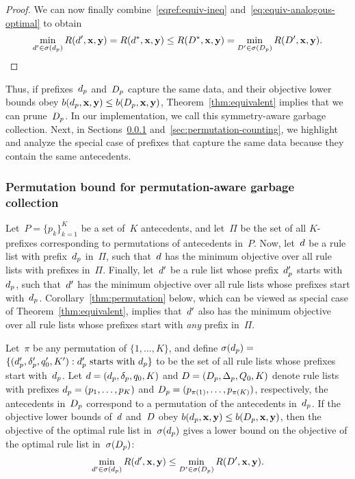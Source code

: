\begin{proof}
We can now finally combine~\eqref{eqref:equiv-ineq}
and~\eqref{eq:equiv-analogous-optimal} to obtain
\begin{align}
\min_{\RL' \in \StartsWith(\Prefix)} \Obj(\RL', \x, \y)
= \Obj(\RL^*, \x, \y) \le \Obj(\RLB^*, \x, \y)
= \min_{\RLB' \in \StartsWith(\PrefixB)} \Obj(\RLB', \x, \y).
\end{align}
\end{proof}

Thus, if prefixes~$d_p$ and~$D_p$ capture the same data,
and their objective lower bounds obey
${b(d_p, \mathbf{x}, \mathbf{y}) \le b(D_p, \mathbf{x}, \mathbf{y})}$,
Theorem~\ref{thm:equivalent} implies that we can prune~$D_p$.
%
In our implementation, we call this symmetry-aware garbage collection.
%
Next, in Sections~\ref{sec:permutation} and~\ref{sec:permutation-counting},
we highlight and analyze the special case of prefixes that capture
the same data because they contain the same antecedents.

\subsubsection{Permutation bound for permutation-aware garbage collection}
\label{sec:permutation}

Let~${P = \{p_k\}_{k=1}^K}$ be a set of~$K$ antecedents,
and let~$\Pi$ be the set of all $K$-prefixes corresponding to
permutations of antecedents in~$P$.
%
Now, let~${d}$ be a rule list with prefix~$d_p$ in~$\Pi$,
such that~${d}$ has the minimum objective over all rule lists
with prefixes in~$\Pi$.
%
Finally, let~${d}'$ be a rule list whose prefix~$d_p'$
starts with~$d_p$, such that~${d}'$ has the minimum objective
over all rule lists whose prefixes start with~$d_p$.
%
Corollary~\ref{thm:permutation} below,
which can be viewed as special case of Theorem~\ref{thm:equivalent},
implies that~${d}'$ also has the minimum objective over all
rule lists whose prefixes start with \emph{any} prefix in~$\Pi$.

\begin{corollary}
\label{thm:permutation}
Let~$\pi$ be any permutation of ${\{1, \dots, K\}}$,
and define ${\sigma(d_p) = }$
${\{(d_p', \delta_p', q_0', K') : d_p' \textnormal{ starts with } d_p \}}$
to be the set of all rule lists whose prefixes start with~$d_p$.
%
Let ${{d} = (d_p, \delta_p, q_0, K)}$
and ${{D} = (D_p, \Delta_p, Q_0, K)}$
denote rule lists with prefixes ${d_p = (p_1, \dots, p_K)}$
and ${D_p = (p_{\pi(1)}, \dots, p_{\pi(K)})}$,
respectively, \ie the antecedents in~$D_p$
correspond to a permutation of the antecedents in~$d_p$.
%
If the objective lower bounds of~${d}$ and~${D}$
obey ${b(d_p, \mathbf{x}, \mathbf{y}) \le b(D_p, \mathbf{x}, \mathbf{y})}$,
then the objective of the optimal rule list in~$\sigma(d_p)$ gives a
lower bound on the objective of the optimal rule list in~$\sigma(D_p)$:
\begin{align}
\min_{\RL' \in \StartsWith(\Prefix)} \Obj(\RL', \x, \y)
\le \min_{\RLB' \in \StartsWith(\PrefixB)} \Obj(\RLB', \x, \y).
\label{eq:permutation}
\end{align}
\end{corollary}

